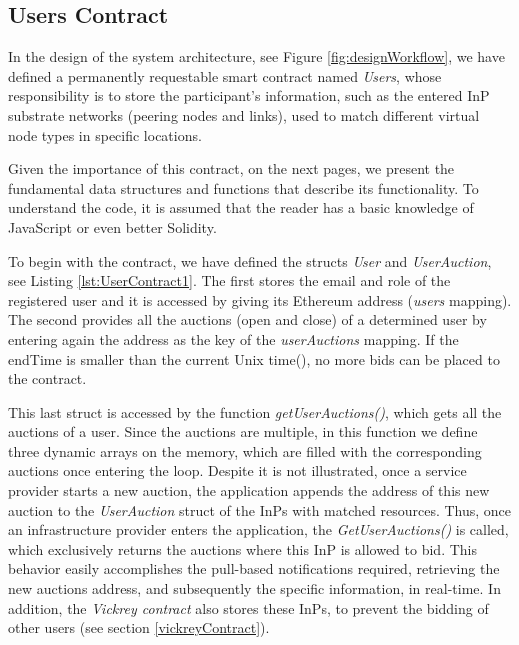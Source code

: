 \subsection{Users Contract}

In the design of the system architecture, see Figure \ref{fig:designWorkflow}, we have defined a permanently requestable smart contract named \textit{Users}, whose responsibility is to store the participant's information, such as the entered InP substrate networks (peering nodes and links), used to match different virtual node types in specific locations. 

Given the importance of this contract, on the next pages, we present the fundamental data structures and functions that describe its functionality. To understand the code, it is assumed that the reader has a basic knowledge of JavaScript or even better Solidity.

To begin with the contract, we have defined the structs \textit{User} and \textit{UserAuction}, see Listing \ref{lst:UserContract1}. The first stores the email and role of the registered user and it is accessed by giving its Ethereum address (\textit{users} mapping). The second provides all the auctions (open and close) of a determined user by entering again the address as the key of the \textit{userAuctions} mapping. If the endTime is smaller than the current Unix time(), no more bids can be placed to the contract. 

This last struct is accessed by the function \textit{getUserAuctions()}, which gets all the auctions of a user. Since the auctions are multiple, in this function we define three dynamic arrays on the memory, which are filled with the corresponding auctions once entering the loop. Despite it is not illustrated, once a service provider starts a new auction, the application appends the address of this new auction to the \textit{UserAuction} struct of the InPs with matched resources. Thus, once an infrastructure provider enters the application, the \textit{GetUserAuctions()} is called, which exclusively returns the auctions where this InP is allowed to bid. This behavior easily accomplishes the pull-based notifications required, retrieving the new auctions address, and subsequently the specific information, in real-time. In addition, the \textit{Vickrey contract} also stores these InPs, to prevent the bidding of other users (see section \ref{vickreyContract}).

